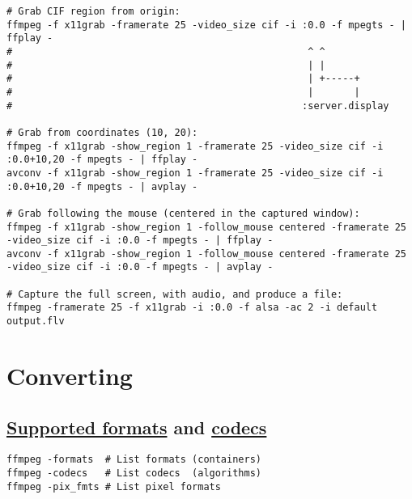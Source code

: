 \begin{verbatim}
# Grab CIF region from origin:
ffmpeg -f x11grab -framerate 25 -video_size cif -i :0.0 -f mpegts - | ffplay -
#                                                   ^ ^
#                                                   | |
#                                                   | +-----+
#                                                   |       |
#                                                  :server.display

# Grab from coordinates (10, 20):
ffmpeg -f x11grab -show_region 1 -framerate 25 -video_size cif -i :0.0+10,20 -f mpegts - | ffplay -
avconv -f x11grab -show_region 1 -framerate 25 -video_size cif -i :0.0+10,20 -f mpegts - | avplay -

# Grab following the mouse (centered in the captured window):
ffmpeg -f x11grab -show_region 1 -follow_mouse centered -framerate 25 -video_size cif -i :0.0 -f mpegts - | ffplay -
avconv -f x11grab -show_region 1 -follow_mouse centered -framerate 25 -video_size cif -i :0.0 -f mpegts - | avplay -

# Capture the full screen, with audio, and produce a file:
ffmpeg -framerate 25 -f x11grab -i :0.0 -f alsa -ac 2 -i default output.flv
\end{verbatim}




\chapter{Converting}

\section{\href{https://www.ffmpeg.org/general.html\#File-Formats}{Supported formats} and \href{https://www.ffmpeg.org/ffmpeg-codecs.html}{codecs}}

\begin{verbatim}
ffmpeg -formats  # List formats (containers)
ffmpeg -codecs   # List codecs  (algorithms)
ffmpeg -pix_fmts # List pixel formats
\end{verbatim}


